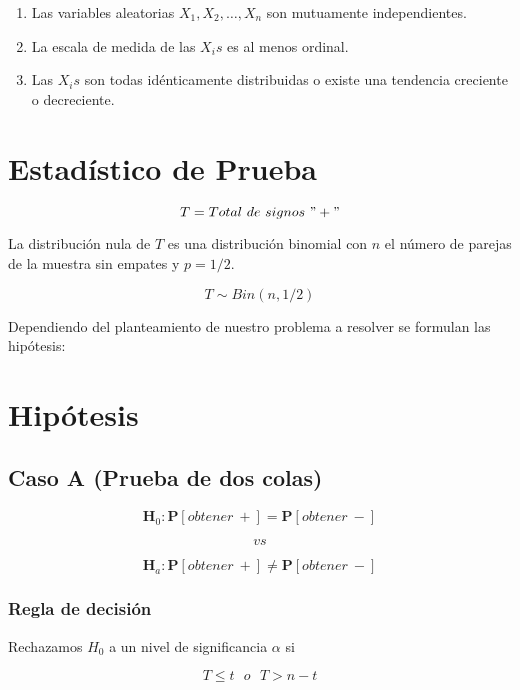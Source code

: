 \documentclass[
  a4paper,
  oneside,
  openany]{book}
\begin{document}
\begin{enumerate}
\def\labelenumi{\arabic{enumi})}
\item
  Las variables aleatorias \(X_{1}, X_{2}, \ldots, X_{n}\) son mutuamente independientes.
\item
  La escala de medida de las \(X_{i}s\) es al menos ordinal.
\item
  Las \(X_{i}s\) son todas idénticamente distribuidas o existe una tendencia creciente o decreciente.
\end{enumerate}

\hypertarget{estaduxedstico-de-prueba-4}{%
\section{Estadístico de Prueba}\label{estaduxedstico-de-prueba-4}}

\[T=Total\ de\ signos\ "+"\]

La distribución nula de \(T\) es una distribución binomial con \(n\) el número de parejas de la muestra sin empates y \(p=1/2\).

\[T\sim Bin(n,1/2)\]

Dependiendo del planteamiento de nuestro problema a resolver se formulan las hipótesis:

\hypertarget{hipuxf3tesis-4}{%
\section{Hipótesis}\label{hipuxf3tesis-4}}

\hypertarget{caso-a-prueba-de-dos-colas-4}{%
\subsection*{Caso A (Prueba de dos colas)}\label{caso-a-prueba-de-dos-colas-4}}


\[\textbf{H}_0: \mathbf{P}[obtener\ +]= \mathbf{P}[obtener\ -]\]

\[vs\]

\[\textbf{H}_a: \mathbf{P}[obtener\ +] \neq \mathbf{P}[obtener\ -]\]

\hypertarget{regla-de-decisiuxf3n-10}{%
\subsubsection*{Regla de decisión}\label{regla-de-decisiuxf3n-10}}


Rechazamos \(H_0\) a un nivel de significancia \(\alpha\) si

\[T \leq t \ \ \  o \ \ \ T>n-t\]
\end{document}
